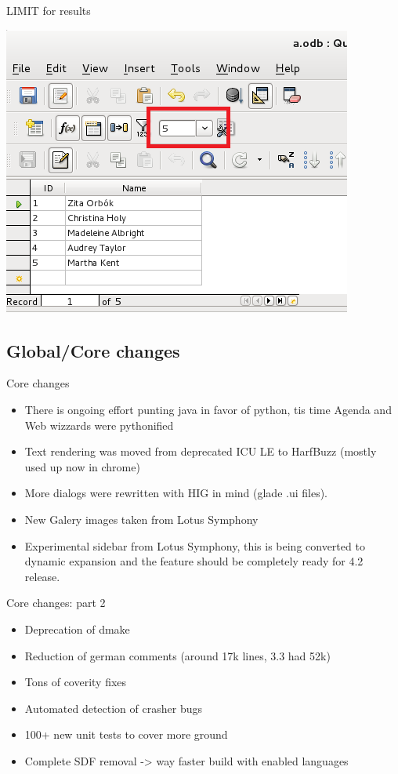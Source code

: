 \documentclass{beamer}
\begin{document}
\begin{frame}{LIMIT for results}
	\begin{center}
	\includegraphics[width= 0.7\linewidth]{limit-base.png}
	\end{center}
\end{frame}

\subsection{Global/Core changes}

\begin{frame}[t]{Core changes}
	\begin{itemize}
	\item There is ongoing effort punting java in favor of python, tis time Agenda and Web wizzards were pythonified
	\item Text rendering was moved from deprecated ICU LE to HarfBuzz (mostly used up now in chrome)
	\item More dialogs were rewritten with HIG in mind (glade .ui files).
	\item New Galery images taken from Lotus Symphony
	\item Experimental sidebar from Lotus Symphony, this is being converted to dynamic expansion and the feature should be completely ready for 4.2 release.
	\end{itemize}
\end{frame}

\begin{frame}[t]{Core changes: part 2}
	\begin{itemize}
	\item Deprecation of dmake
	\item Reduction of german comments (around 17k lines, 3.3 had 52k)
	\item Tons of coverity fixes
	\item Automated detection of crasher bugs
	\item 100+ new unit tests to cover more ground
	\item Complete SDF removal -> way faster build with enabled languages
	\end{itemize}
\end{frame}
\end{document}

